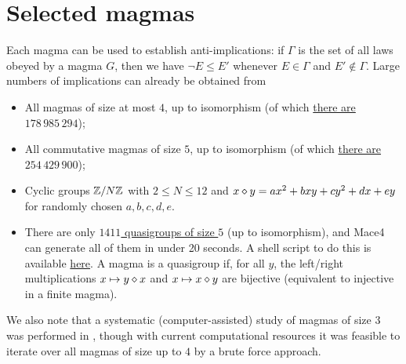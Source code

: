 \chapter{Selected magmas}\label{selected-magmas-chapter}

Each magma can be used to establish anti-implications: if $\Gamma$ is the set of all laws obeyed by a magma $G$, then we have $\neg E \leq E'$ whenever $E \in \Gamma$ and $E' \not \in \Gamma$.  Large numbers of implications can already be obtained from

\begin{itemize}
  \item All magmas of size at most $4$, up to isomorphism (of which \href{https://oeis.org/A001329}{there are $178\,985\,294$});
  \item All commutative magmas of size $5$, up to isomorphism (of which \href{https://oeis.org/A001425}{there are $254\,429\,900$});
  \item Cyclic groups $\mathbb{Z}/N\mathbb{Z}$ with $2 \leq N \leq 12$ and $x \diamond y = ax^2+bxy+cy^2+dx+ey$ for randomly chosen $a,b,c,d,e$.
  \item There are only \href{https://oeis.org/A057991}{$1411$ quasigroups of size $5$} (up to isomorphism), and Mace4 can generate all of them in under 20 seconds. A shell script to do this is available \href{https://github.com/zaklogician/equational_theories/tree/cancellative_magmas/scripts/cancellative_magmas}{here}. A magma is a quasigroup if, for all $y$, the left/right multiplications $x\mapsto y\diamond x$ and $x\mapsto x\diamond y$ are bijective (equivalent to injective in a finite magma).
\end{itemize}

We also note that a systematic (computer-assisted) study of magmas of size $3$ was performed in \cite{berman-burris}, though with current computational resources it was feasible to iterate over all magmas of size up to $4$ by a brute force approach.

